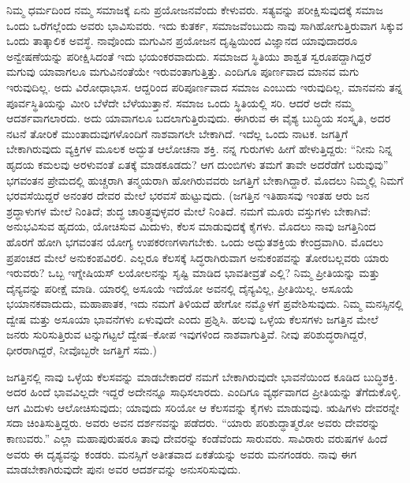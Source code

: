 ನಿಮ್ಮ ಧರ್ಮದಿಂದ ನಮ್ಮ ಸಮಾಜಕ್ಕೆ ಏನು ಪ್ರಯೋಜನವೆಂದು ಕೇಳುವರು. ಸತ್ಯವನ್ನು ಪರೀಕ್ಷಿಸುವುದಕ್ಕೆ ಸಮಾಜ ಒಂದು ಒರೆಗಲ್ಲೆಂದು ಅವರು ಭಾವಿಸುವರು. ಇದು ಕುತರ್ಕ, ಸಮಾಜವೆಂಬುದು ನಾವು ಸಾಗಿಹೋಗುತ್ತಿರುವಾಗ ಸಿಕ್ಕುವ ಒಂದು ತಾತ್ಕಾಲಿಕ ಅವಸ್ಥೆ. ನಾವೊಂದು ಮಗುವಿನ ಪ್ರಯೋಜನ ದೃಷ್ಟಿಯಿಂದ ವಿಜ್ಞಾನದ ಯಾವುದಾದರೂ ಅನ್ವೇಷಣೆಯನ್ನು ಪರೀಕ್ಷಿಸಿದಂತೆ ಇದು ಭಯಂಕರವಾದುದು. ಸಮಾಜದ ಸ್ಥಿತಿಯು ಶಾಶ್ವತ ಸ್ವರೂಪದ್ದಾಗಿದ್ದರೆ ಮಗುವು ಯಾವಾಗಲೂ ಮಗುವಿನಂತೆಯೇ ಇರುವಂತಾಗುತ್ತಿತ್ತು. ಎಂದಿಗೂ ಪೂರ್ಣವಾದ ಮಾನವ ಮಗು ಇರುವುದಿಲ್ಲ. ಅದು ವಿರೋಧಾಭಾಸ. ಆದ್ದರಿಂದ ಪರಿಪೂರ್ಣವಾದ ಸಮಾಜ ಎಂಬುದು ಇರುವುದಿಲ್ಲ. ಮಾನವನು ತನ್ನ ಪೂರ್ವಸ್ಥಿತಿಯನ್ನು ಮೀರಿ ಬೆಳೆದೇ ಬೆಳೆಯುತ್ತಾನೆ. ಸಮಾಜ ಒಂದು ಸ್ಥಿತಿಯಲ್ಲಿ ಸರಿ. ಆದರೆ ಅದೇ ನಮ್ಮ ಆದರ್ಶವಾಗಲಾರದು. ಅದು ಯಾವಾಗಲೂ ಬದಲಾಗುತ್ತಿರುವುದು. ಈಗಿರುವ ಈ ವೈಶ್ಯ ಬುದ್ಧಿಯ ಸಂಸ್ಕೃತಿ, ಅದರ ನಟನೆ ತೋರಿಕೆ ಮುಂತಾದುವುಗಳೊಂದಿಗೆ ನಾಶವಾಗಲೇ ಬೇಕಾಗಿದೆ. ಇದೆಲ್ಲ ಒಂದು ನಾಟಕ. ಜಗತ್ತಿಗೆ ಬೇಕಾಗಿರುವುದು ವ್ಯಕ್ತಿಗಳ ಮೂಲಕ ಅದ್ಭುತ ಆಲೋಚನಾ ಶಕ್ತಿ. ನನ್ನ ಗುರುಗಳು ಹೀಗೆ ಹೇಳುತ್ತಿದ್ದರು: “ನೀನು ನಿನ್ನ ಹೃದಯ ಕಮಲವು ಅರಳುವಂತೆ ಏತಕ್ಕೆ ಮಾಡಕೂಡದು? ಆಗ ದುಂಬಿಗಳು ತಮಗೆ ತಾವೇ ಅದರೆಡೆಗೆ ಬರುವುವು” ಭಗವಂತನ ಪ್ರೇಮದಲ್ಲಿ ಹುಚ್ಚರಾಗಿ ತನ್ಮಯರಾಗಿ ಹೋಗಿರುವವರು ಜಗತ್ತಿಗೆ ಬೇಕಾಗಿದ್ದಾರೆ. ಮೊದಲು ನಿಮ್ಮಲ್ಲಿ ನಿಮಗೆ ಭರವಸೆಯಿದ್ದರೆ ಅನಂತರ ದೇವರ ಮೇಲೆ ಭರವಸೆ ಹುಟ್ಟುವುದು. (ಜಗತ್ತಿನ ಇತಿಹಾಸವು ಇಂತಹ ಆರು ಜನ ಶ್ರದ್ಧಾಳುಗಳ ಮೇಲೆ ನಿಂತಿದೆ; ಶುದ್ಧ ಚಾರಿತ್ರ್ಯವುಳ್ಳವರ ಮೇಲೆ ನಿಂತಿದೆ. ನಮಗೆ ಮೂರು ವಸ್ತುಗಳು ಬೇಕಾಗಿವೆ: ಅನುಭವಿಸುವ ಹೃದಯ, ಯೋಚಿಸುವ ಮಿದುಳು, ಕೆಲಸ ಮಾಡುವುದಕ್ಕೆ ಕೈಗಳು. ಮೊದಲು ನಾವು ಜಗತ್ತಿನಿಂದ ಹೊರಗೆ ಹೋಗಿ ಭಗವಂತನ ಯೋಗ್ಯ ಉಪಕರಣಗಳಾಗಬೇಕು. ಒಂದು ಅದ್ಭುತಶಕ್ತಿಯ ಕೇಂದ್ರವಾಗಿರಿ. ಮೊದಲು ಪ್ರಪಂಚದ ಮೇಲೆ ಅನುಕಂಪವಿರಲಿ. ಎಲ್ಲರೂ ಕೆಲಸಕ್ಕೆ ಸಿದ್ಧರಾಗಿರುವಾಗ ಅನುಕಂಪವನ್ನು ತೋರಬಲ್ಲವರು ಯಾರು ಇರುವರು? ಒಬ್ಬ ಇಗ್ನೇಷಿಯಸ್​ ಲಯೋಲನನ್ನು ಸೃಷ್ಟಿ ಮಾಡಿದ ಭಾವತೀವ್ರತೆ ಎಲ್ಲಿ? ನಿಮ್ಮ ಪ್ರೀತಿಯನ್ನು ಮತ್ತು ದೈನ್ಯವನ್ನು ಪರೀಕ್ಷೆ ಮಾಡಿ. ಯಾರಲ್ಲಿ ಅಸೂಯೆ ಇದೆಯೋ ಅವನಲ್ಲಿ ದೈನ್ಯವಿಲ್ಲ, ಪ್ರೀತಿಯಿಲ್ಲ. ಅಸೂಯೆ ಭಯಾನಕವಾದುದು, ಮಹಾಪಾತಕ, ಇದು ನಮಗೆ ತಿಳಿಯದೆ ಹೇಗೋ ನಮ್ಮೊಳಗೆ ಪ್ರವೇಶಿಸುವುದು. ನಿಮ್ಮ ಮನಸ್ಸಿನಲ್ಲಿ ದ್ವೇಷ ಮತ್ತು ಅಸೂಯಾ ಭಾವನೆಗಳು ಏಳುವುದೇ ಎಂದು ಪ್ರಶ್ನಿಸಿ. ಹಲವು ಒಳ್ಳೆಯ ಕೆಲಸಗಳು ಜಗತ್ತಿನ ಮೇಲೆ ಜನರು ಸುರಿಸುತ್ತಿರುವ ಟನ್ನುಗಟ್ಟಲೆ ದ್ವೇಷ–ಕೋಪ ಇವುಗಳಿಂದ ನಾಶವಾಗುತ್ತಿವೆ. ನೀವು ಪರಿಶುದ್ಧರಾಗಿದ್ದರೆ, ಧೀರರಾಗಿದ್ದರೆ, ನೀವೊಬ್ಬರೇ ಜಗತ್ತಿಗೆ ಸಮ.)

ಜಗತ್ತಿನಲ್ಲಿ ನಾವು ಒಳ್ಳೆಯ ಕೆಲಸವನ್ನು ಮಾಡಬೇಕಾದರೆ ನಮಗೆ ಬೇಕಾಗಿರುವುದೇ ಭಾವನೆಯಿಂದ ಕೂಡಿದ ಬುದ್ಧಿಶಕ್ತಿ. ಅದರ ಹಿಂದೆ ಭಾವವಿಲ್ಲದೇ ಇದ್ದರೆ ಅದೇನನ್ನೂ ಸಾಧಿಸಲಾರದು. ಎಂದಿಗೂ ವ್ಯರ್ಥವಾಗದ ಪ್ರೀತಿಯನ್ನು ತೆಗೆದುಕೊಳ್ಳಿ. ಆಗ ಮಿದುಳು ಆಲೋಚಿಸುವುದು; ಯಾವುದು ಸರಿಯೋ ಆ ಕೆಲಸವನ್ನು ಕೈಗಳು ಮಾಡುವುವು. ಋಷಿಗಳು ದೇವರನ್ನೇ ಸದಾ ಚಿಂತಿಸುತ್ತಿದ್ದರು. ಅವರು ಅವನ ದರ್ಶನವನ್ನು ಪಡೆದರು. “ಯಾರು ಪರಿಶುದ್ಧಾತ್ಮರೋ ಅವರು ದೇವರನ್ನು ಕಾಣುವರು.” ಎಲ್ಲಾ ಮಹಾಪುರುಷರೂ ತಾವು ದೇವರನ್ನು ಕಂಡೆವೆಂದು ಸಾರುವರು. ಸಾವಿರಾರು ವರುಷಗಳ ಹಿಂದೆ ಅವರು ಈ ದೃಶ್ಯವನ್ನು ಕಂಡರು. ಮನಸ್ಸಿಗೆ ಅತೀತವಾದ ಏಕತೆಯನ್ನು ಅವರು ಮನಗಂಡರು. ನಾವು ಈಗ ಮಾಡಬೇಕಾಗಿರುವುದೇ ಪುನಃ ಅವರ ಆದರ್ಶವನ್ನು ಅನುಸರಿಸುವುದು.

